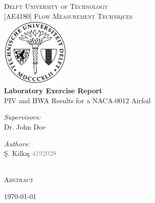 \begin{titlepage}
\begin{center}

\textsc{\LARGE Delft University of Technology}\\[0.25cm]
\textsc{\normalsize [AE4180] Flow Measurement Techniques}\\[1.5cm]
\includegraphics[width=0.25\textwidth]{Title/delft_seal.pdf}\\[1.5cm]
{\huge \bfseries Laboratory Exercise Report} \\
\huge  PIV and HWA Results for a NACA-0012 Airfoil \\[1.0cm]

\begin{minipage}[t]{0.4\textwidth}
\begin{flushleft} \large
\emph{Supervisors:}\\
    Dr. John Doe\\
    

\end{flushleft}
\end{minipage}
\begin{minipage}[t]{0.4\textwidth}
\begin{flushright} \large
\emph{Authors:}\\
    \c{S}. K{\i}lk{\i}\c{s} \textcolor{gray}{4192028}\\
    
\end{flushright}
\end{minipage}\\[2.0cm]

\large \textsc{Abstract}

\begin{minipage}[t]{0.8\textwidth} \large



\end{minipage}

\vfill

\small{\today}


\end{center}
\end{titlepage}
\restoregeometry